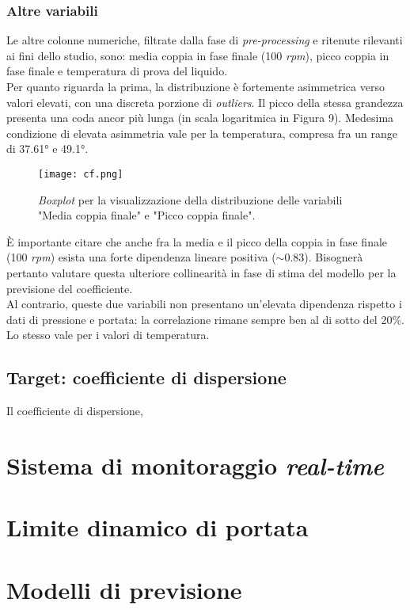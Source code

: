 \documentclass[fleqn,10pt]{SelfArx} %
\begin{document}
\subsubsection{Altre variabili}
Le altre colonne numeriche, filtrate dalla fase di \textit{pre-processing} e ritenute rilevanti ai fini dello studio, sono: media coppia in fase finale (100 \textit{rpm}), picco coppia in fase finale e temperatura di prova del liquido.\\
Per quanto riguarda la prima, la distribuzione è fortemente asimmetrica verso valori elevati, con una discreta porzione di \textit{outliers}. Il picco della stessa grandezza presenta una coda ancor più lunga (in scala logaritmica in Figura 9). Medesima condizione di elevata asimmetria vale per la temperatura, compresa fra un range di 37.61° e 49.1°.
\begin{figure}[h]
    \centering
    \texttt{[image: cf.png]}
    \label{fig:em}
    \caption{\textit{Boxplot} per la visualizzazione della distribuzione delle variabili "Media coppia finale" e "Picco coppia finale".}
\end{figure}
È importante citare che anche fra la media e il picco della coppia in fase finale (100 \textit{rpm}) esista una forte dipendenza lineare positiva ($\sim$0.83). Bisognerà pertanto valutare questa ulteriore collinearità in fase di stima del modello per la previsione del coefficiente.\\
Al contrario, queste due variabili non presentano un'elevata dipendenza rispetto i dati di pressione e portata: la correlazione rimane sempre ben al di sotto del 20\%. Lo stesso vale per i valori di temperatura.
\subsection{Target: coefficiente di dispersione}
Il coefficiente di dispersione, 
\section{Sistema di monitoraggio \textit{real-time}}
\section{Limite dinamico di portata}
\section{Modelli di previsione}



\end{document}
